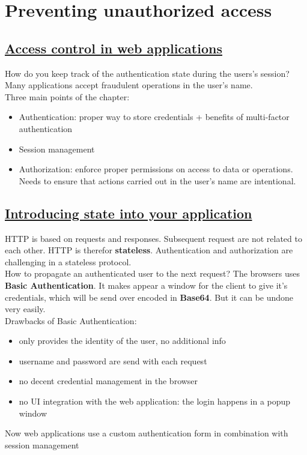 \documentclass[titlepage]{article}
\begin{document}
    \section{Preventing unauthorized access}
    \subsection{\href{https://youtu.be/wOvqyiXjDiE}{Access control in web applications}}
    How do you keep track of the authentication state during the users's session? Many applications accept fraudulent operations in the user's name.\\
    Three main points of the chapter:
    \begin{itemize}
        \item Authentication: proper way to store credentials + benefits of multi-factor authentication
        \item Session management
        \item Authorization: enforce proper permissions on access to data or operations. Needs to ensure that actions carried out in the user's name are intentional.
    \end{itemize}
    \subsection{\href{https://youtu.be/Qah9Sxw1RWI}{Introducing state into your application}}
    HTTP is based on requests and responses. Subsequent request are not related to each other. HTTP is therefor \textbf{stateless}. Authentication and authorization are challenging in a stateless protocol.\\
    How to propagate an authenticated user to the next request? The browsers uses \textbf{Basic Authentication}. It makes appear a window for the client to give it's credentials, which will be send over encoded in \textbf{Base64}. But it can be undone very easily.\\
    Drawbacks of Basic Authentication:
    \begin{itemize}
        \item only provides the identity of the user, no additional info
        \item username and password are send with each request
        \item no decent credential management in the browser
        \item no UI integration with the web application: the login happens in a popup window
    \end{itemize}
    Now web applications use a custom authentication form in combination with session management
\end{document}
